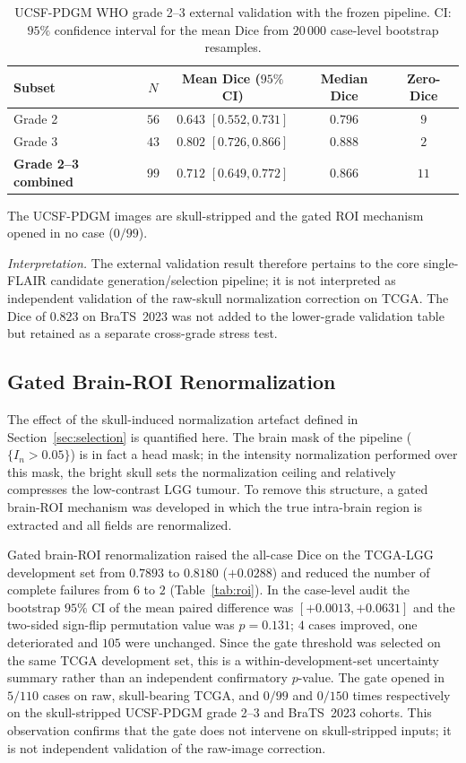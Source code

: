 \documentclass[11pt,a4paper]{article}
\begin{document}
\begin{table}[htpb!]\centering
\caption{UCSF-PDGM WHO grade 2--3 external validation with the frozen pipeline.
CI: $95\%$ confidence interval for the mean Dice from $20\,000$ case-level
bootstrap resamples.}
\label{tab:ucsf-validation}
\begin{tabular}{lcccc}
\toprule
Subset & $N$ & Mean Dice ($95\%$ CI) & Median Dice & Zero-Dice \\
\midrule
Grade 2 & $56$ & $0.643$ $[0.552,0.731]$ & $0.796$ & $9$ \\
Grade 3 & $43$ & $0.802$ $[0.726,0.866]$ & $0.888$ & $2$ \\
\textbf{Grade 2--3 combined} & $99$ & $\mathbf{0.712}$ $[0.649,0.772]$ & $\mathbf{0.866}$ & $11$ \\
\bottomrule
\end{tabular}
\end{table}

The UCSF-PDGM images are skull-stripped and the gated ROI mechanism opened in no
case ($0/99$).

\emph{Interpretation.} The external validation result therefore pertains to the
core single-FLAIR candidate generation/selection pipeline; it is not interpreted
as independent validation of the raw-skull normalization correction on TCGA. The
Dice of $0.823$ on BraTS~2023 was not added to the lower-grade validation table
but retained as a separate cross-grade stress test.

\subsection{Gated Brain-ROI Renormalization}\label{sec:roi-results}

The effect of the skull-induced normalization artefact defined in
Section~\ref{sec:selection} is quantified here. The brain mask of the pipeline ($\{I_n > 0.05\}$) is in fact a head mask; in the intensity normalization performed over this mask, the bright skull sets the normalization ceiling and
relatively compresses the low-contrast LGG tumour. To remove this structure, a
gated brain-ROI mechanism was developed in which the true intra-brain region is
extracted and all fields are renormalized.

Gated brain-ROI renormalization raised the all-case Dice on the TCGA-LGG
development set from $0.7893$ to $0.8180$ ($+0.0288$) and reduced the number of
complete failures from $6$ to $2$ (Table~\ref{tab:roi}). In the case-level audit
the bootstrap $95\%$ CI of the mean paired difference was $[+0.0013,+0.0631]$ and
the two-sided sign-flip permutation value was $p{=}0.131$; $4$ cases improved,
one deteriorated and $105$ were unchanged. Since the gate threshold was selected
on the same TCGA development set, this is a within-development-set uncertainty
summary rather than an independent confirmatory $p$-value. The gate opened in
$5/110$ cases on raw, skull-bearing TCGA, and $0/99$ and $0/150$ times
respectively on the skull-stripped UCSF-PDGM grade 2--3 and BraTS~2023 cohorts.
This observation confirms that the gate does not intervene on skull-stripped
inputs; it is not independent validation of the raw-image correction.
\end{document}
